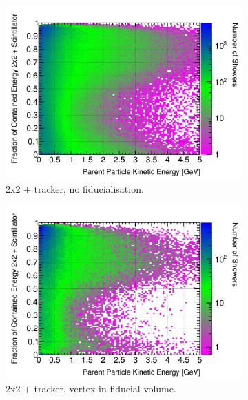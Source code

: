 \documentclass[10pt,a4paper,openany]{article}
\begin{document}
\begin{figure}[htbp]
\begin{subfigure}[b]{0.49\textwidth}
		\label{}
	\end{subfigure}	
	\begin{subfigure}[b]{0.49\textwidth}
		\centering
		\includegraphics[width=1.0\textwidth]{Pi0_contained_frac_2x2_Scintillator_gap.png}
		\caption{2x2 + tracker, no fiducialisation.}
		\label{}
	\end{subfigure}	
	\hfill
	\begin{subfigure}[b]{0.49\textwidth}
		\centering
		\includegraphics[width=1.0\textwidth]{Pi0_contained_frac_2x2_Scintillator_fiducial_gap.png}
		\caption{2x2 + tracker, vertex in fiducial volume.}
		\label{}
	\end{subfigure}
	\begin{subfigure}[b]{0.49\textwidth}
		\centering

\end{subfigure}
\end{figure}
\end{document}
